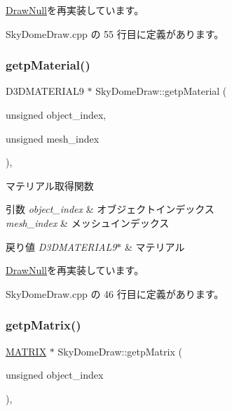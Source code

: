 \mbox{\hyperlink{class_draw_null_a98cc7cd43b19d9d70cc621d23d89286f}{Draw\+Null}}を再実装しています。



 Sky\+Dome\+Draw.\+cpp の 55 行目に定義があります。

\mbox{\label{class_sky_dome_draw_a45d3e8d70753af83c84c7a7c9193459f}} 
\subsubsection{\texorpdfstring{getp\+Material()}{getpMaterial()}}
{\footnotesize\ttfamily D3\+D\+M\+A\+T\+E\+R\+I\+A\+L9 $\ast$ Sky\+Dome\+Draw\+::getp\+Material (\begin{DoxyParamCaption}\item[{unsigned}]{object\+\_\+index,  }\item[{unsigned}]{mesh\+\_\+index }\end{DoxyParamCaption})\hspace{0.3cm}{\ttfamily [override]}, {\ttfamily [virtual]}}



マテリアル取得関数 


\begin{DoxyParams}{引数}
{\em object\+\_\+index} & オブジェクトインデックス \\
\hline
{\em mesh\+\_\+index} & メッシュインデックス \\
\hline
\end{DoxyParams}

\begin{DoxyRetVals}{戻り値}
{\em D3\+D\+M\+A\+T\+E\+R\+I\+A\+L9$\ast$} & マテリアル \\
\hline
\end{DoxyRetVals}


\mbox{\hyperlink{class_draw_null_a0c1efe55fea325ad277594be6fe1e938}{Draw\+Null}}を再実装しています。



 Sky\+Dome\+Draw.\+cpp の 46 行目に定義があります。

\mbox{\label{class_sky_dome_draw_accbc05d1bbde9ad9d6b7180d91e9ed89}} 
\subsubsection{\texorpdfstring{getp\+Matrix()}{getpMatrix()}}
{\footnotesize\ttfamily \mbox{\hyperlink{_matrix_8h_a032295cd9fb1b711757c90667278e744}{M\+A\+T\+R\+IX}} $\ast$ Sky\+Dome\+Draw\+::getp\+Matrix (\begin{DoxyParamCaption}\item[{unsigned}]{object\+\_\+index }\end{DoxyParamCaption})\hspace{0.3cm}{\ttfamily [override]}, {\ttfamily [virtual]}}



